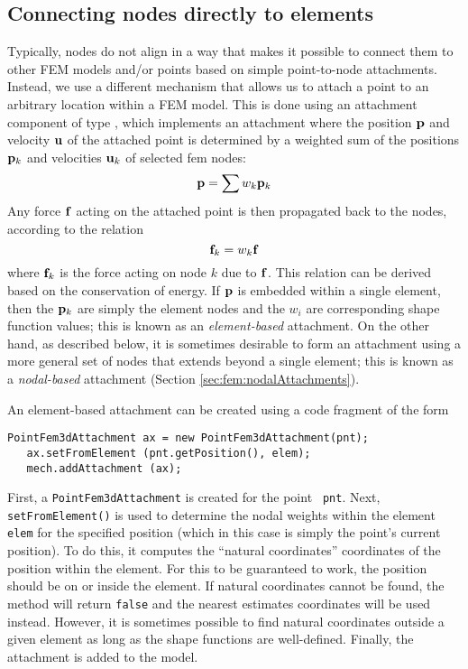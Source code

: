 \subsection{Connecting nodes directly to elements}

Typically, nodes do not align in a way that makes it
possible to connect them to other FEM models and/or points based on
simple point-to-node attachments.  Instead, we use a different
mechanism that allows us to attach a point to an arbitrary location
within a FEM model. This is done using an attachment component of
type
, which
implements an attachment where the position ${\bf p}$ and velocity ${\bf u}$ of the
attached point is determined by a weighted sum of the positions ${\bf p}_k$ 
and velocities ${\bf u}_k$ of selected fem nodes:
%
\begin{equation}
{\bf p} = \sum w_k {\bf p}_k
\label{pointFemAttachment:eqn}
\end{equation}
%
Any force ${\bf f}$ acting on the attached point is then propagated back
to the nodes, according to the relation
%
\begin{equation}
{\bf f}_k = w_k {\bf f}
\label{pointFemForces:eqn}
\end{equation}
%
where ${\bf f}_k$ is the force acting on node $k$ due to ${\bf f}$.  This
relation can be derived based on the conservation of energy.
If ${\bf p}$ is embedded within a single element, then the ${\bf p}_k$ are
simply the element nodes and the $w_i$ are corresponding shape
function values; this is known as an {\it element-based} attachment.
On the other hand, as described below, it is sometimes desirable to
form an attachment using a more general set of nodes that extends
beyond a single element; this is known as a {\it nodal-based}
attachment (Section \ref{sec:fem:nodalAttachments}).

An element-based attachment can be created using a code fragment
of the form
%
\begin{lstlisting}[]
   PointFem3dAttachment ax = new PointFem3dAttachment(pnt);
   ax.setFromElement (pnt.getPosition(), elem);
   mech.addAttachment (ax);
\end{lstlisting}
%
First, a {\tt PointFem3dAttachment} is created for the point {\tt
pnt}. Next, {\tt setFromElement()} is used to determine the nodal
weights within the element {\tt elem} for the specified position
(which in this case is simply the point's current position).  To do
this, it computes the ``natural coordinates'' coordinates of the
position within the element. For this to be guaranteed to work, the
position should be on or inside the element. If natural coordinates
cannot be found, the method will return {\tt false} and the nearest
estimates coordinates will be used instead. However, it is
sometimes possible to find natural coordinates outside a given element
as long as the shape functions are well-defined. Finally, the
attachment is added to the model.

